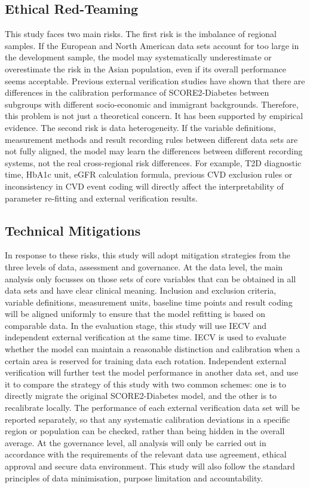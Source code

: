 \documentclass[conference]{IEEEtran}
\begin{document}
\subsection{Ethical Red-Teaming}

This study faces two main risks. The first risk is the imbalance of regional samples. If the European and North American data sets account for too large in the development sample, the model may systematically underestimate or overestimate the risk in the Asian population, even if its overall performance seems acceptable. Previous external verification studies have shown that there are differences in the calibration performance of SCORE2-Diabetes between subgroups with different socio-economic and immigrant backgrounds. Therefore, this problem is not just a theoretical concern. It has been supported by empirical evidence.
The second risk is data heterogeneity. If the variable definitions, measurement methods and result recording rules between different data sets are not fully aligned, the model may learn the differences between different recording systems, not the real cross-regional risk differences. For example, T2D diagnostic time, HbA1c unit, eGFR calculation formula, previous CVD exclusion rules or inconsistency in CVD event coding will directly affect the interpretability of parameter re-fitting and external verification results.



\subsection{Technical Mitigations}
In response to these risks, this study will adopt mitigation strategies from the three levels of data, assessment and governance. At the data level, the main analysis only focusses on those sets of core variables that can be obtained in all data sets and have clear clinical meaning. Inclusion and exclusion criteria, variable definitions, measurement units, baseline time points and result coding will be aligned uniformly to ensure that the model refitting is based on comparable data.
In the evaluation stage, this study will use IECV and independent external verification at the same time. IECV is used to evaluate whether the model can maintain a reasonable distinction and calibration when a certain area is reserved for training data each rotation. Independent external verification will further test the model performance in another data set, and use it to compare the strategy of this study with two common schemes: one is to directly migrate the original SCORE2-Diabetes model, and the other is to recalibrate locally. The performance of each external verification data set will be reported separately, so that any systematic calibration deviations in a specific region or population can be checked, rather than being hidden in the overall average.
At the governance level, all analysis will only be carried out in accordance with the requirements of the relevant data use agreement, ethical approval and secure data environment. This study will also follow the standard principles of data minimisation, purpose limitation and accountability.
\end{document}
